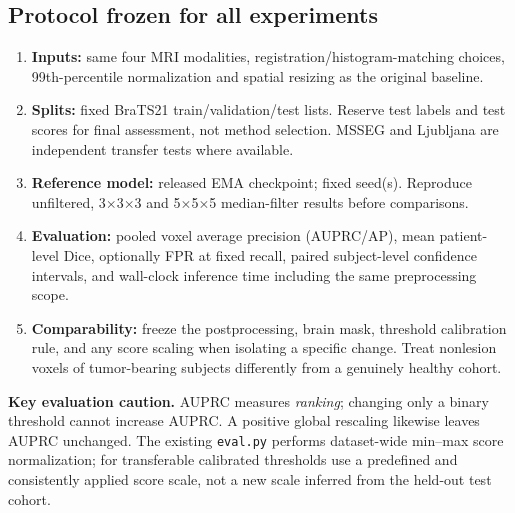 \documentclass[10pt,a4paper]{article}
\newcommand{\file}[1]{\nolinkurl{#1}}
\begin{document}
\subsection{Protocol frozen for all experiments}
\begin{enumerate}
\item \textbf{Inputs:} same four MRI modalities, registration/histogram-matching choices, 99th-percentile normalization and spatial resizing as the original baseline.
\item \textbf{Splits:} fixed BraTS21 train/validation/test lists. Reserve test labels and test scores for final assessment, not method selection. MSSEG and Ljubljana are independent transfer tests where available.
\item \textbf{Reference model:} released EMA checkpoint; fixed seed(s). Reproduce unfiltered, 3$\times$3$\times$3 and 5$\times$5$\times$5 median-filter results before comparisons.
\item \textbf{Evaluation:} pooled voxel average precision (AUPRC/AP), mean patient-level Dice, optionally FPR at fixed recall, paired subject-level confidence intervals, and wall-clock inference time including the same preprocessing scope.
\item \textbf{Comparability:} freeze the postprocessing, brain mask, threshold calibration rule, and any score scaling when isolating a specific change. Treat nonlesion voxels of tumor-bearing subjects differently from a genuinely healthy cohort.
\end{enumerate}
\begin{attentionbox}
\textbf{Key evaluation caution.} AUPRC measures \emph{ranking}; changing only a binary threshold cannot increase AUPRC. A positive global rescaling likewise leaves AUPRC unchanged. The existing \file{eval.py} performs dataset-wide min--max score normalization; for transferable calibrated thresholds use a predefined and consistently applied score scale, not a new scale inferred from the held-out test cohort.
\end{attentionbox}
\end{document}

